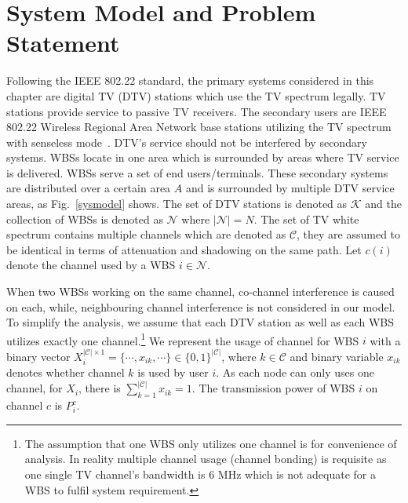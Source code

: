 \documentclass[times]{ettauth}
\theoremstyle{mytheoremstyle}
\theoremstyle{mytheoremstyle}
\theoremstyle{mytheoremstyle}
\begin{document}
\section{System Model and Problem Statement}
\label{SystemModel}
Following the IEEE 802.22 standard, the primary systems considered in this chapter are digital TV (DTV) stations which use the TV spectrum legally. 
TV stations provide service to passive TV receivers.
The secondary users are IEEE 802.22 Wireless Regional Area Network base stations utilizing the TV spectrum with senseless mode~\cite{SenseLess2011}. 
DTV's service should not be interfered by secondary systems. 
WBSs locate in one area which is surrounded by areas where TV service is delivered.
WBSs serve a set of end users/terminals.
These secondary systems are distributed over a certain area $A$ and is surrounded by multiple DTV service areas, as Fig.~\ref{sysmodel} shows. 
The set of DTV stations is denoted as $\mathcal{K}$ and the collection of WBSs is denoted as $\mathcal{N}$ where $|\mathcal{N}|=N$. 
The set of TV white spectrum contains multiple channels which are denoted as $\mathcal{C}$, they are assumed to be identical in terms of attenuation and shadowing on the same path.
Let $c(i)$ denote the channel used by a WBS $i\in \mathcal{N}$.

When two WBSs working on the same channel, co-channel interference is caused on each, while, neighbouring channel interference is not considered in our model. 
To simplify the analysis, we assume that each DTV station as well as each WBS utilizes exactly one channel.\footnote{The assumption that one WBS only utilizes one channel is for convenience of analysis. In reality multiple channel usage (channel bonding) is requisite as one single TV channel's bandwidth is 6 MHz which is not adequate for a WBS to fulfil system requirement. 
}
We represent the usage of channel for WBS $i$ with a binary vector $X_i^{|\mathcal{C}|\times 1}=\{\cdots, x_{ik}, \cdots\}\in \{0,1\}^{|\mathcal{C}|}$, where $k\in \mathcal{C}$ and binary variable $x_{ik}$ denotes whether channel $k$ is used by user $i$. 
As each node can only uses one channel, for $X_i$, there is $\sum_{k=1}^{|\mathcal{C}|}x_{ik}=1$. 
The transmission power of WBS $i$ on channel $c$ is $P_i^c$. 
\end{document}
